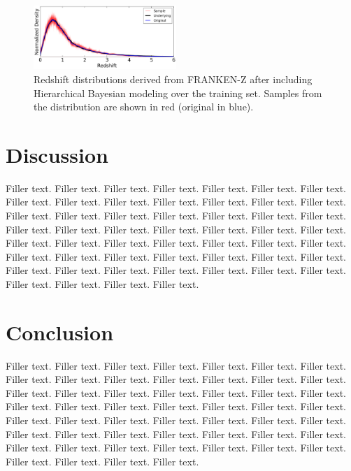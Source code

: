 \documentclass[a4paper,fleqn,usenatbib,english]{mnras}
\begin{document}
\begin{figure}
\begin{center}
\includegraphics[width=0.48\textwidth]{z_fits_frankenz_sel_hier.png}
\end{center}
\caption{Redshift distributions derived from FRANKEN-Z after including Hierarchical Bayesian modeling over the training set. Samples from the distribution are shown in red (original in blue).
}\label{fig:redshift_hb}
\end{figure}

\section{Discussion}
\label{sec:disc}

Filler text. Filler text. Filler text. Filler text. Filler text. Filler text. Filler text. Filler text. Filler text. Filler text. Filler text. Filler text. Filler text. Filler text. Filler text. Filler text. Filler text. Filler text. Filler text. Filler text. Filler text. Filler text. Filler text. Filler text. Filler text. Filler text. Filler text. Filler text. Filler text. Filler text. Filler text. Filler text. Filler text. Filler text. Filler text. Filler text. Filler text. Filler text. Filler text. Filler text. Filler text. Filler text. Filler text. Filler text. Filler text. Filler text. Filler text. Filler text. Filler text. Filler text. Filler text. Filler text. Filler text.

\section{Conclusion}
\label{sec:conc}

Filler text. Filler text. Filler text. Filler text. Filler text. Filler text. Filler text. Filler text. Filler text. Filler text. Filler text. Filler text. Filler text. Filler text. Filler text. Filler text. Filler text. Filler text. Filler text. Filler text. Filler text. Filler text. Filler text. Filler text. Filler text. Filler text. Filler text. Filler text. Filler text. Filler text. Filler text. Filler text. Filler text. Filler text. Filler text. Filler text. Filler text. Filler text. Filler text. Filler text. Filler text. Filler text. Filler text. Filler text. Filler text. Filler text. Filler text. Filler text. Filler text. Filler text. Filler text. Filler text. Filler text. 
\end{document}
